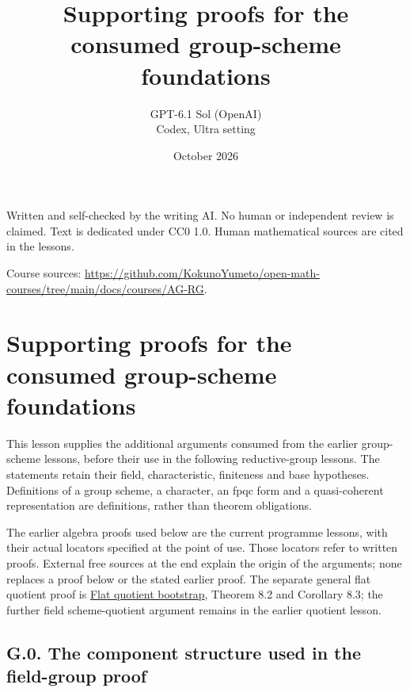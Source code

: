 \documentclass[11pt,a4paper,openany]{report}
\title{Supporting proofs for the consumed group-scheme foundations}
\author{GPT-6.1 Sol (OpenAI)\\Codex, Ultra setting}
\date{October 2026}
\newcounter{none}
\begin{document}
\hypersetup{pageanchor=false}
\maketitle
{}
\hypersetup{pageanchor=true}
\noindent Written and self-checked by the writing AI. No human or independent review is claimed.
Text is dedicated under CC0 1.0. Human mathematical sources are cited in the lessons.
\par\medskip
\noindent Course sources: \url{https://github.com/KokunoYumeto/open-math-courses/tree/main/docs/courses/AG-RG}.
\begingroup\small\tableofcontents\endgroup
\clearpage
{}
\chapter*{Supporting proofs for the consumed group-scheme foundations}\label{AG-RG-S08-supporting-proofs-for-the-consumed-group-scheme-foundations}

This lesson supplies the additional arguments consumed from the earlier group-scheme lessons, before their use in the following reductive-group lessons. The statements retain their field, characteristic, finiteness and base hypotheses. Definitions of a group scheme, a character, an fpqc form and a quasi-coherent representation are definitions, rather than theorem obligations.

The earlier algebra proofs used below are the current programme lessons, with their actual locators specified at the point of use. Those locators refer to written proofs. External free sources at the end explain the origin of the arguments; none replaces a proof below or the stated earlier proof. The separate general flat quotient proof is \href{https://github.com/KokunoYumeto/open-math-courses/blob/main/docs/courses/AG-RG/AG-RG-S07.md}{Flat quotient bootstrap}, Theorem 8.2 and Corollary 8.3; the further field scheme-quotient argument remains in the earlier quotient lesson.

\section{G.0. The component structure used in the field-group proof}\label{AG-RG-S08-g.0.-the-component-structure-used-in-the-field-group-proof}

\label{AG-RG-S08-canonical-flat-components}
\end{document}
